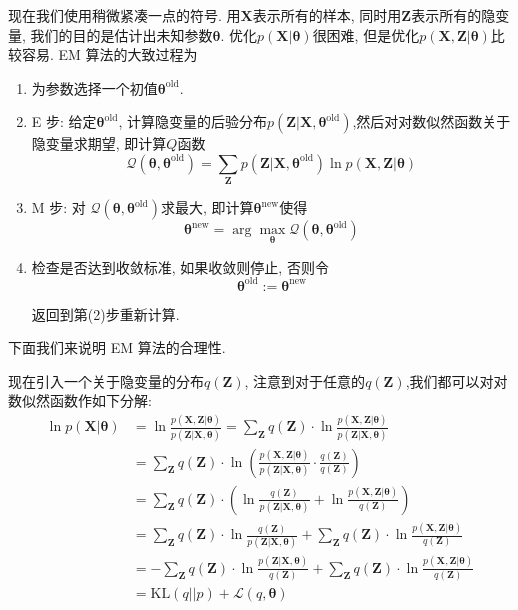 \documentclass[a4paper,UTF8]{ctexart}
\theoremstyle{plain} \newtheorem{theorem}{定理}[section]
\theoremstyle{plain} \newtheorem{definition}{定义}[section]
\theoremstyle{plain} \newtheorem{lemma}{引理}[section]
\theoremstyle{plain} \newtheorem{proposition}{命题}[section]
\theoremstyle{plain} \newtheorem{example}{例}
\theoremstyle{plain} \newtheorem{remark}{注}
\theoremstyle{plain} \newtheorem{corollary}{推论}[section]
\begin{document}
现在我们使用稍微紧凑一点的符号. 用$\bm{X}$表示所有的样本, 同时用$\bm{Z}$表示所有的隐变量, 我们的目的是估计出未知参数$\bm{\theta}$. 优化$p(\bm{X} | \bm{\theta})$很困难, 但是优化$p(\bm{X}, \bm{Z} | \bm{\theta})$比较容易. EM 算法的大致过程为
\begin{enumerate}[(1)]
\item 为参数选择一个初值$\bm{\theta}^{\mathrm{old}}$.

\item E 步: 给定$\bm{\theta}^{\mathrm{old}}$, 计算隐变量的后验分布$p(\bm{Z} | \bm{X}, \bm{\theta}^{\mathrm{old}})$,然后对对数似然函数关于隐变量求期望, 即计算$Q$函数
\begin{equation*}
\mathcal{Q} (\bm{\theta}, \bm{\theta}^{\mathrm{old}}) = \sum_{\bm{Z}} p(\bm{Z} | \bm{X}, \bm{\theta}^{\mathrm{old}}) \ln p(\bm{X}, \bm{Z} | \bm{\theta})
\end{equation*}

\item M 步: 对
$\mathcal{Q} (\bm{\theta}, \bm{\theta}^{\mathrm{old}})$求最大, 即计算$\bm{\theta}^{\mathrm{new}}$使得
\begin{equation*}
\bm{\theta}^{\mathrm{new}} = \arg \max_{\bm{\theta}} 
\mathcal{Q} (\bm{\theta}, \bm{\theta}^{\mathrm{old}})
\end{equation*}

\item 检查是否达到收敛标准, 如果收敛则停止, 否则令
\begin{equation*}
\bm{\theta}^{\mathrm{old}} := \bm{\theta}^{\mathrm{new}}
\end{equation*}

返回到第(2)步重新计算.

\end{enumerate}


下面我们来说明 EM 算法的合理性.

现在引入一个关于隐变量的分布$q(\bm{Z})$, 注意到对于任意的$q(\bm{Z})$,我们都可以对对数似然函数作如下分解:
\begin{align*}
\ln p(\bm{X} | \bm{\theta}) & = \ln \frac{p(\bm{X}, \bm{Z} | \bm{\theta})}{p(\bm{Z} | \bm{X}, \bm{\theta})} = \sum_{\bm{Z}} q(\bm{Z}) \cdot \ln \frac{p(\bm{X}, \bm{Z} | \bm{\theta})}{p(\bm{Z} | \bm{X}, \bm{\theta})} \\ 
& = \sum_{\bm{Z}} q(\bm{Z}) \cdot \ln \left( \frac{p(\bm{X}, \bm{Z} | \bm{\theta})}{p(\bm{Z} | \bm{X}, \bm{\theta})} \cdot \frac{q(\bm{Z})}{q(\bm{Z})} \right) \\ 
& = \sum_{\bm{Z}} q(\bm{Z}) \cdot \left( \ln \frac{q(\bm{Z})}{p(\bm{Z} | \bm{X}, \bm{\theta})} + \ln \frac{p(\bm{X}, \bm{Z} | \bm{\theta})}{q(\bm{Z})} \right) \\ 
& = \sum_{\bm{Z}} q(\bm{Z}) \cdot \ln \frac{q(\bm{Z})}{p(\bm{Z} | \bm{X}, \bm{\theta})} +  \sum_{\bm{Z}} q(\bm{Z}) \cdot \ln \frac{p(\bm{X}, \bm{Z} | \bm{\theta})}{q(\bm{Z})} \\ 
& = - \sum_{\bm{Z}} q(\bm{Z}) \cdot \ln \frac{p(\bm{Z} | \bm{X}, \bm{\theta})}{q(\bm{Z})} + \sum_{\bm{Z}} q(\bm{Z}) \cdot \ln \frac{p(\bm{X}, \bm{Z} | \bm{\theta})}{q(\bm{Z})} \\ 
& = \mathrm{KL}(q || p) + \mathcal{L}(q,\bm{\theta})
\end{align*}
\end{document}
